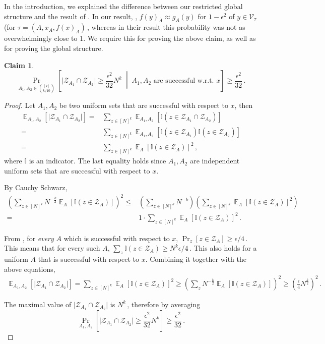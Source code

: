 \documentclass[11pt]{article}
\numberwithin{equation}{section}
\newtheorem{claim}[theorem]{Claim}
\theoremstyle{definition}
\theoremstyle{plain}
\newcommand{\Prob}[2][]{\Pr_{{#1}}\left[#2\right]} %
\DeclareMathOperator*{\E}{\mathbb{E}} %
\newcommand{\Ex}[2][]{\E_{{#1}}\Brac{#2}} %
\newcommand{\Paren}[1]{\left(#1\right)} %
\newcommand{\Brac}[1]{\left[#1\right]} %
\newcommand{\abs}[1]{\lvert#1\rvert} %
\newcommand{\given}{\;\middle\vert\;} %
\newcommand{\Ind}{\mathbb I} %
\newcommand\f{f} %
\newcommand{\g}{g} %
\newcommand\cons{\mathcal{V}} %
\newcommand\rest[1]{{\bar{#1}}}  %
\newcommand\zi{\mathcal{Z}} %
\begin{document}
In the introduction, we explained the difference between our restricted global structure and the result of \cite{dinur2014direct}. In our result, , $\f(y)_\rest{A}\approx\g_A(y)$ for $1-\epsilon^2$ of $y\in \cons_\tau$ (for $\tau=(A,x_A,\f(x)_A)$\,, whereas in their result this probability was not as overwhelmingly close to $1$. We require this for proving the above claim, as well as for proving the global structure.

\begin{claim}\label{claim:sets joint cons inputs} 
	\[\Prob[A_1,A_2\in\binom{[k]}{k/10}]{\abs{\zi_{A_1}\cap\zi_{A_2}}\geq \frac{\epsilon^2}{32}N^k\given A_1,A_2 \textrm{ are successful w.r.t. }x } \geq \frac{\epsilon^2}{32} \,.\] %
\end{claim}
\begin{proof}
	Let $A_1,A_2$ be two uniform sets that are successful with respect to $x$, then
	\begin{align*}
	\Ex[A_1,A_2]{\abs{\zi_{A_1}\cap\zi_{A_2}}}=&\sum_{z\in[N]^k} \Ex[A_1,A_2]{\Ind(z\in\zi_{A_1}\cap\zi_{A_2})}\nonumber\\ =& 
	\sum_{z\in[N]^k}\Ex[A_1,A_2]{\Ind(z\in\zi_{A_1})\Ind(z\in \zi_{A_2})}
	\nonumber\\=&\sum_{z\in[N]^k} \Ex[A]{\Ind(z\in\zi_{A})}^2 \label{eq:avg sconn}\,,%
	\end{align*}
	where $\Ind$ is an indicator. The last equality holds since $A_1,A_2$ are independent uniform sets that are successful with respect to $x$.
	
	By Cauchy Schwarz, 
	\begin{align*}
	\Paren{\sum_{z\in[N]^k} N^{-\frac{k}{2}}\Ex[A]{\Ind(z\in\zi_{A})}}^2 \leq& \Paren{\sum_{z\in[N]^k}N^{-k}}\Paren{\sum_{z\in[N]^k}\Ex[A]{\Ind(z\in\zi_{A})}^2} \\
	=&1\cdot \sum_{z\in[N]^k}\Ex[A]{\Ind(z\in\zi_{A})}^2\,.%
	\end{align*}
	
	From , for \emph{every} $A$ which is successful with respect to $x$, $\Prob[z]{z\in\zi_{A}}\geq
\epsilon/4$\,. %
 This means that for every such $A$, $\sum_z\Ind(z\in\zi_A)\geq 
 N^k\epsilon/4$\,. %
 This also holds for a uniform $A$ that is successful with respect to $x$. Combining it together with the above equations,
	\begin{align*}
	\Ex[A_1,A_2]{\abs{\zi_{A_1}\cap\zi_{A_2}}} = \sum_{z\in[N]^k}\Ex[A]{\Ind(z\in\zi_{A})}^2
	\geq \Paren{\sum_z N^{-\frac{k}{2}}\Ex[A]{\Ind(z\in\zi_{A})}}^2
	\geq \Paren{\frac{\epsilon}{4}N^{\frac{k}{2}}}^2 \,.%
	\end{align*}
	
	The maximal value of $\abs{\zi_{A_1}\cap\zi_{A_2}}$ is $N^k$\,, therefore by averaging
	\[\Prob[A_1,A_2]{\abs{\zi_{A_1}\cap \zi_{A_2}} \geq \frac{\epsilon^2}{32} N^k} \geq \frac{\epsilon^2}{32}   \,.\]%
\end{proof}
\end{document}
